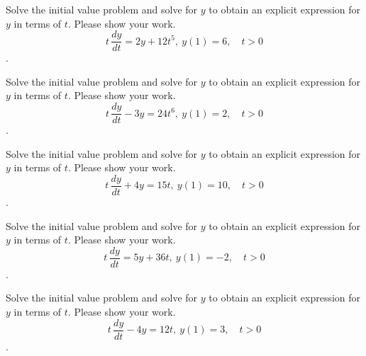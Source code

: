\ifnum {}
\question[5] Solve the initial value problem and solve for $y$ to obtain an explicit expression for $y$ in terms of $t$. Please show your work.
$$\displaystyle t\,\frac{dy}{dt} = 2y + 12 t^5, \ y(1) = 6, \quad t > 0$$.
\fi

\ifnum {}
\question[5] Solve the initial value problem and solve for $y$ to obtain an explicit expression for $y$ in terms of $t$. Please show your work.
$$\displaystyle t\,\frac{dy}{dt} - 3y = 24 t^6, \ y(1) = 2, \quad t > 0$$.
\fi    

\ifnum {}
\question[5] Solve the initial value problem and solve for $y$ to obtain an explicit expression for $y$ in terms of $t$. Please show your work.
$$\displaystyle t\,\frac{dy}{dt} + 4y = 15 t, \ y(1) = 10, \quad t > 0$$.
\fi    

\ifnum {}
\question[5] Solve the initial value problem and solve for $y$ to obtain an explicit expression for $y$ in terms of $t$. Please show your work.
$$\displaystyle t\,\frac{dy}{dt} = 5y + 36 t, \ y(1) = -2, \quad t > 0$$.
\fi    

\ifnum {}
\question[5] Solve the initial value problem and solve for $y$ to obtain an explicit expression for $y$ in terms of $t$. Please show your work.
$$\displaystyle t\,\frac{dy}{dt} - 4y = 12 t, \ y(1) = 3, \quad t > 0$$.
\fi       